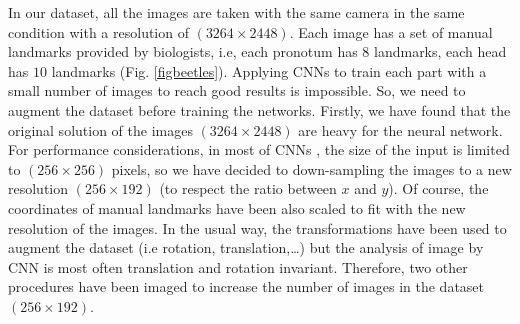 \documentclass[review]{elsarticle}
\begin{document}
In our dataset, all the images are taken with the same camera in the same condition with a resolution of $(3264 \times 2448)$. Each image has a set of manual landmarks provided by biologists, i.e, each pronotum has $8$ landmarks, each head has $10$ landmarks (Fig. \ref{figbeetles}). Applying CNNs to train each part with a small number of images to reach good results is impossible. So, we need to augment the dataset before training the networks. Firstly, we have found that the original solution of the images $(3264 \times 2448)$ are heavy for the neural network. For performance considerations, in most of CNNs \cite{cintas2016automatic, lecun2010convolutional, sun2013deep}, the size of the input is limited to $(256 \times 256)$ pixels, so we have decided to down-sampling the images to a new resolution $(256 \times 192)$ (to respect the ratio between $x$ and $y$). Of course, the coordinates of manual landmarks have been also scaled to fit with the new resolution of the images. In the usual way, the transformations have been used to augment the dataset (i.e rotation, translation,\ldots) but the analysis of image by CNN is most often translation and rotation invariant. Therefore, two other procedures have been imaged to increase the number of images in the dataset $(256 \times 192)$.
\end{document}

